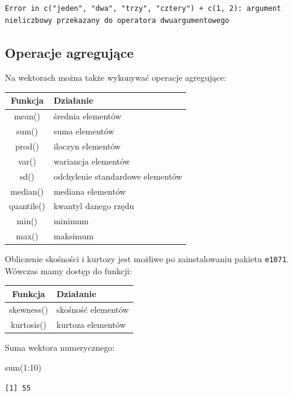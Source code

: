 \documentclass[
  letterpaper,
  DIV=11,
  numbers=noendperiod]{scrreprt}
\newenvironment{Shaded}{\begin{snugshade}}{\end{snugshade}}
\newcommand{\DecValTok}[1]{\textcolor[rgb]{0.68,0.00,0.00}{#1}}
\newcommand{\FunctionTok}[1]{\textcolor[rgb]{0.28,0.35,0.67}{#1}}
\newcommand{\NormalTok}[1]{\textcolor[rgb]{0.00,0.23,0.31}{#1}}
\newcommand{\SpecialCharTok}[1]{\textcolor[rgb]{0.37,0.37,0.37}{#1}}
\begin{document}
\begin{verbatim}
Error in c("jeden", "dwa", "trzy", "cztery") + c(1, 2): argument nieliczbowy przekazany do operatora dwuargumentowego
\end{verbatim}

\hypertarget{operacje-agregujux105ce}{%
\subsection{Operacje agregujące}\label{operacje-agregujux105ce}}

Na wektorach można także wykonywać operacje agregujące:

\begin{longtable}[]{@{}cl@{}}
\toprule()
Funkcja & Działanie \\
\midrule()
\endhead
mean() & średnia elementów \\
sum() & suma elementów \\
prod() & iloczyn elementów \\
var() & wariancja elementów \\
sd() & odchylenie standardowe elementów \\
median() & mediana elementów \\
quantile() & kwantyl danego rzędu \\
min() & minimum \\
max() & maksimum \\
\bottomrule()
\end{longtable}

Obliczenie skośności i kurtozy jest możliwe po zainstalowaniu pakietu
\texttt{e1071}. Wówczas mamy dostęp do funkcji:

\begin{longtable}[]{@{}cl@{}}
\toprule()
Funkcja & Działanie \\
\midrule()
\endhead
skewness() & skośność elementów \\
kurtosis() & kurtoza elementów \\
\bottomrule()
\end{longtable}

Suma wektora numerycznego:

\begin{Shaded}
\begin{Highlighting}[]
\FunctionTok{sum}\NormalTok{(}\DecValTok{1}\SpecialCharTok{:}\DecValTok{10}\NormalTok{)}
\end{Highlighting}
\end{Shaded}

\begin{verbatim}
[1] 55
\end{verbatim}
\end{document}

